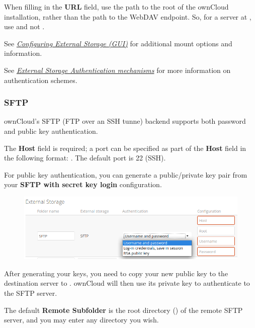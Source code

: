 \documentclass[letterpaper,10pt,english]{sphinxmanual}
\begin{document}
When filling in the \textbf{URL} field, use the path to the root of the ownCloud
installation, rather than the path to the WebDAV endpoint. So, for a server at
, use  and not
.

See {\hyperref[configuration_files/external_storage_configuration_gui::doc]{\emph{Configuring External Storage (GUI)}}} for additional mount
options and information.

See {\hyperref[configuration_files/external_storage/auth_mechanisms::doc]{\emph{External Storage Authentication mechanisms}}} for more information on authentication schemes.


\subsubsection{SFTP}
\label{configuration_files/external_storage/sftp::doc}\label{configuration_files/external_storage/sftp:sftp}
ownCloud's SFTP (FTP over an SSH tunne) backend supports both password and
public key authentication.

The \textbf{Host} field is required; a port can be specified as part of the \textbf{Host}
field in the following format: . The default port is 22
(SSH).

For public key authentication, you can generate a public/private key pair from
your \textbf{SFTP with secret key login} configuration.
\begin{figure}[htbp]
\centering

\includegraphics{auth_mechanism.png}
\end{figure}

After generating your keys, you need to copy your new public key to the
destination server to . ownCloud will then use its
private key to authenticate to the SFTP server.

The default \textbf{Remote Subfolder} is the root directory (\code{/}) of the remote
SFTP server, and you may enter any directory you wish.
\end{document}

